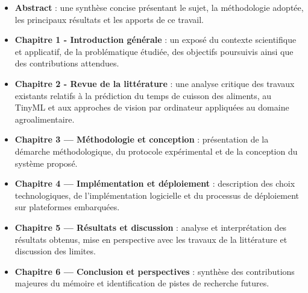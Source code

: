 \begin{itemize}
	\item \textbf{Abstract} : une synthèse concise présentant le sujet, la méthodologie adoptée, les principaux résultats et les apports de ce travail.
	\item \textbf{Chapitre 1 - Introduction générale} : un exposé du contexte scientifique et applicatif, de la problématique étudiée, des objectifs poursuivis ainsi que des contributions attendues.
	\item \textbf{Chapitre 2 - Revue de la littérature} : une analyse critique des travaux existants relatifs à la prédiction du temps de cuisson des aliments, au TinyML et aux approches de vision par ordinateur appliquées au domaine agroalimentaire.
	\item \textbf{Chapitre 3 — Méthodologie et conception} : présentation de la démarche méthodologique, du protocole expérimental et de la conception du système proposé.
	\item \textbf{Chapitre 4 — Implémentation et déploiement} : description des choix technologiques, de l’implémentation logicielle et du processus de déploiement sur plateformes embarquées.
	\item \textbf{Chapitre 5 — Résultats et discussion} : analyse et interprétation des résultats obtenus, mise en perspective avec les travaux de la littérature et discussion des limites.
	\item \textbf{Chapitre 6 — Conclusion et perspectives} : synthèse des contributions majeures du mémoire et identification de pistes de recherche futures.
\end{itemize}
